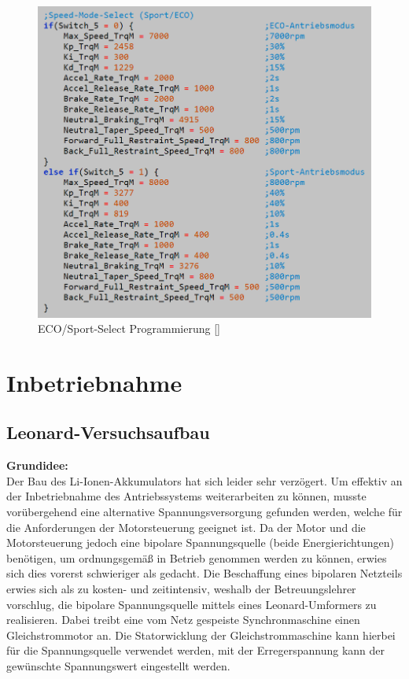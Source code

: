 \begin{figure}[H]
	\begin{center}
		\includegraphics[scale=0.5]{figures/antrieb/ECO_Sport_Select_Programmschnippsel.png}
		\caption{ECO/Sport-Select Programmierung [\cite{VCL_Programmcode}]}
	\end{center}
\end{figure}

\newpage


\section{Inbetriebnahme}
\subsection{Leonard-Versuchsaufbau}
\textbf{Grundidee:}
\\[2mm]
Der Bau des Li-Ionen-Akkumulators hat sich leider sehr verzögert. Um effektiv an der Inbetriebnahme des Antriebssystems weiterarbeiten zu können, musste vorübergehend eine alternative Spannungsversorgung gefunden werden, welche für die Anforderungen der Motorsteuerung geeignet ist. Da der Motor und die Motorsteuerung jedoch eine bipolare Spannungsquelle (beide Energierichtungen) benötigen, um ordnungsgemäß in Betrieb genommen werden zu können, erwies sich dies vorerst schwieriger als gedacht. Die Beschaffung eines bipolaren Netzteils erwies sich als zu kosten- und zeitintensiv, weshalb der Betreuungslehrer vorschlug, die bipolare Spannungsquelle mittels eines Leonard-Umformers zu realisieren. Dabei treibt eine vom Netz gespeiste Synchronmaschine einen Gleichstrommotor an. Die Statorwicklung der Gleichstrommaschine kann hierbei für die Spannungsquelle verwendet werden, mit der Erregerspannung kann der gewünschte Spannungswert eingestellt werden.

